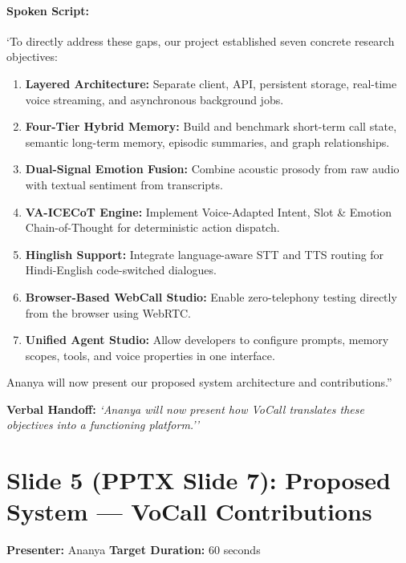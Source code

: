 \documentclass[11pt,a4paper]{article}
\begin{document}
\paragraph{Spoken Script:}
`To directly address these gaps, our project established seven concrete research objectives:
\begin{enumerate}
    \item \textbf{Layered Architecture:} Separate client, API, persistent storage, real-time voice streaming, and asynchronous background jobs.
    \item \textbf{Four-Tier Hybrid Memory:} Build and benchmark short-term call state, semantic long-term memory, episodic summaries, and graph relationships.
    \item \textbf{Dual-Signal Emotion Fusion:} Combine acoustic prosody from raw audio with textual sentiment from transcripts.
    \item \textbf{VA-ICECoT Engine:} Implement Voice-Adapted Intent, Slot \& Emotion Chain-of-Thought for deterministic action dispatch.
    \item \textbf{Hinglish Support:} Integrate language-aware STT and TTS routing for Hindi-English code-switched dialogues.
    \item \textbf{Browser-Based WebCall Studio:} Enable zero-telephony testing directly from the browser using WebRTC.
    \item \textbf{Unified Agent Studio:} Allow developers to configure prompts, memory scopes, tools, and voice properties in one interface.
\end{enumerate}
Ananya will now present our proposed system architecture and contributions.''

\noindent\textbf{Verbal Handoff:} \textit{`Ananya will now present how VoCall translates these objectives into a functioning platform.''}

\newpage

\section*{Slide 5 (PPTX Slide 7): Proposed System — VoCall Contributions}
\textbf{Presenter:} Ananya \hfill \textbf{Target Duration:} 60 seconds
\end{document}
